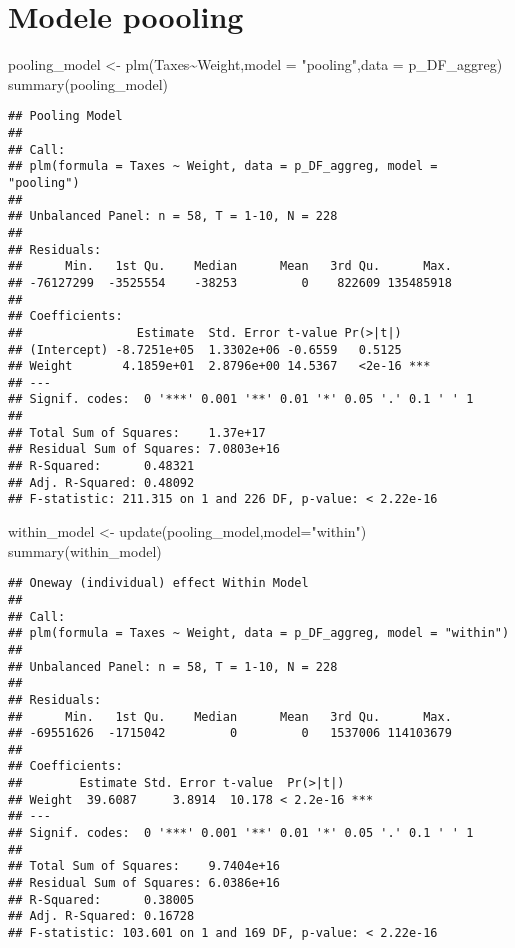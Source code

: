 \documentclass[
]{book}
\newenvironment{Shaded}{\begin{snugshade}}{\end{snugshade}}
\newcommand{\AttributeTok}[1]{\textcolor[rgb]{0.77,0.63,0.00}{#1}}
\newcommand{\FunctionTok}[1]{\textcolor[rgb]{0.00,0.00,0.00}{#1}}
\newcommand{\NormalTok}[1]{#1}
\newcommand{\OtherTok}[1]{\textcolor[rgb]{0.56,0.35,0.01}{#1}}
\newcommand{\SpecialCharTok}[1]{\textcolor[rgb]{0.00,0.00,0.00}{#1}}
\newcommand{\StringTok}[1]{\textcolor[rgb]{0.31,0.60,0.02}{#1}}
\begin{document}
\hypertarget{modele-poooling}{%
\chapter{Modele poooling}\label{modele-poooling}}

\begin{Shaded}
\begin{Highlighting}[]
\NormalTok{pooling\_model }\OtherTok{\textless{}{-}} \FunctionTok{plm}\NormalTok{(Taxes}\SpecialCharTok{\textasciitilde{}}\NormalTok{Weight,}\AttributeTok{model =} \StringTok{"pooling"}\NormalTok{,}\AttributeTok{data =}\NormalTok{ p\_DF\_aggreg)}
\FunctionTok{summary}\NormalTok{(pooling\_model)}
\end{Highlighting}
\end{Shaded}

\begin{verbatim}
## Pooling Model
## 
## Call:
## plm(formula = Taxes ~ Weight, data = p_DF_aggreg, model = "pooling")
## 
## Unbalanced Panel: n = 58, T = 1-10, N = 228
## 
## Residuals:
##      Min.   1st Qu.    Median      Mean   3rd Qu.      Max. 
## -76127299  -3525554    -38253         0    822609 135485918 
## 
## Coefficients:
##                Estimate  Std. Error t-value Pr(>|t|)    
## (Intercept) -8.7251e+05  1.3302e+06 -0.6559   0.5125    
## Weight       4.1859e+01  2.8796e+00 14.5367   <2e-16 ***
## ---
## Signif. codes:  0 '***' 0.001 '**' 0.01 '*' 0.05 '.' 0.1 ' ' 1
## 
## Total Sum of Squares:    1.37e+17
## Residual Sum of Squares: 7.0803e+16
## R-Squared:      0.48321
## Adj. R-Squared: 0.48092
## F-statistic: 211.315 on 1 and 226 DF, p-value: < 2.22e-16
\end{verbatim}

\begin{Shaded}
\begin{Highlighting}[]
\NormalTok{within\_model }\OtherTok{\textless{}{-}} \FunctionTok{update}\NormalTok{(pooling\_model,}\AttributeTok{model=}\StringTok{"within"}\NormalTok{)}
\FunctionTok{summary}\NormalTok{(within\_model)}
\end{Highlighting}
\end{Shaded}

\begin{verbatim}
## Oneway (individual) effect Within Model
## 
## Call:
## plm(formula = Taxes ~ Weight, data = p_DF_aggreg, model = "within")
## 
## Unbalanced Panel: n = 58, T = 1-10, N = 228
## 
## Residuals:
##      Min.   1st Qu.    Median      Mean   3rd Qu.      Max. 
## -69551626  -1715042         0         0   1537006 114103679 
## 
## Coefficients:
##        Estimate Std. Error t-value  Pr(>|t|)    
## Weight  39.6087     3.8914  10.178 < 2.2e-16 ***
## ---
## Signif. codes:  0 '***' 0.001 '**' 0.01 '*' 0.05 '.' 0.1 ' ' 1
## 
## Total Sum of Squares:    9.7404e+16
## Residual Sum of Squares: 6.0386e+16
## R-Squared:      0.38005
## Adj. R-Squared: 0.16728
## F-statistic: 103.601 on 1 and 169 DF, p-value: < 2.22e-16
\end{verbatim}
\end{document}
